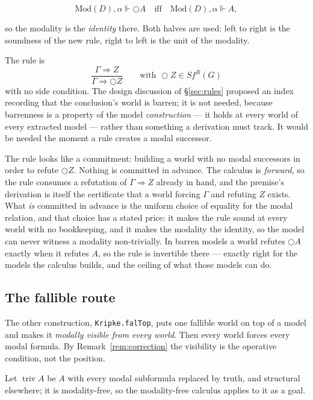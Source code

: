 \documentclass[11pt,a4paper]{article}
\begin{document}
\[ \mathrm{Mod}(D),\alpha \Vdash \bigcirc A \quad\text{iff}\quad
   \mathrm{Mod}(D),\alpha \Vdash A, \]

so the modality is the \emph{identity} there. Both halves are used: left
to right is the soundness of the new rule, right to left is the unit of
the modality.

The rule is
\[
\frac{\Gamma \Rightarrow Z}{\Gamma \Rightarrow \bigcirc Z}
\qquad\text{with } \bigcirc Z \in Sf^{R}(G)
\]
with no side condition. The design discussion of \S\ref{sec:rules}
proposed an index recording that the conclusion's world is barren; it is
not needed, because barrenness is a property of the model
\emph{construction} --- it holds at every world of every extracted model
--- rather than something a derivation must track. It would be needed the
moment a rule creates a modal successor.

\begin{remark}
The rule looks like a commitment: building a world with no modal
successors in order to refute $\bigcirc Z$. Nothing is committed in
advance. The calculus is \emph{forward}, so the rule consumes a refutation
of $\Gamma \Rightarrow Z$ already in hand, and the premise's derivation is
itself the certificate that a world forcing $\Gamma$ and refuting $Z$
exists. What \emph{is} committed in advance is the uniform choice of
equality for the modal relation, and that choice has a stated price: it
makes the rule sound at every world with no bookkeeping, and it makes the
modality the identity, so the model can never witness a modality
non-trivially. In barren models a world refutes $\bigcirc A$ exactly when
it refutes $A$, so the rule is invertible there --- exactly right for the
models the calculus builds, and the ceiling of what those models can do.
\end{remark}

\subsection{The fallible route}

The other construction, \texttt{Kripke.falTop}, puts one fallible world on
top of a model and makes it \emph{modally visible from every world}. Then
every world forces every modal formula. By Remark~\ref{rem:correction} the
visibility is the operative condition, not the position.

Let $\operatorname{triv} A$ be $A$ with every modal subformula replaced by
truth, and structural elsewhere; it is modality-free, so the
modality-free calculus applies to it as a goal.
\end{document}
